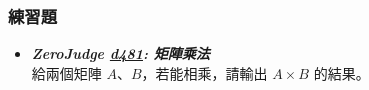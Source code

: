 \subsubsection*{練習題}
\begin{itemize}[label={\Checkmark}]
\item \textbf{\textit{ZeroJudge \href{http://zerojudge.tw/ShowProblem?problemid=d481}{d481}: 矩陣乘法}}\\
給兩個矩陣 $A$、$B$，若能相乘，請輸出 $A\times{B}$ 的結果。
\end{itemize}